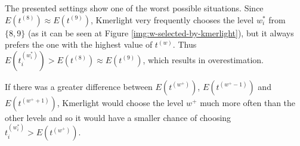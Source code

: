 The presented settings show one of the worst possible situations. Since
$E(t^{(8)}) \approx E(t^{(9)})$, Kmerlight very frequently chooses the level $w_i^*$ from 
$\{8, 9\}$ (as it can be seen at Figure \ref{img:w-selected-by-kmerlight}), 
but it always prefers the one with the highest value of $t^{(w)}$.
Thus $E(t_i^{(w^*_i)}) > E(t^{(8)}) \approx E(t^{(9)})$, which results in overestimation.

If there was a greater difference between $E(t^{(w^+)})$, $E(t^{(w^+-1)})$ and
$E(t^{(w^++1)})$, Kmerlight would choose the level $w^+$ much more often than the other
levels and so it would have a smaller chance of choosing $t_i^{(w^*_i)} > E(t^{(w^+)})$.
